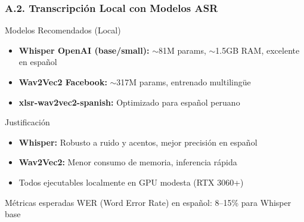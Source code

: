 \documentclass[aspectratio=169,10pt]{beamer}
\begin{document}
\begin{frame}
  \frametitle{A.2. Transcripción Local con Modelos ASR}
  
  \begin{block}{Modelos Recomendados (Local) \cite{radford2022whisper}}
    \begin{itemize}
      \item \textbf{Whisper OpenAI (base/small):} $\sim$81M params, $\sim$1.5GB RAM, excelente en español
      \item \textbf{Wav2Vec2 Facebook:} $\sim$317M params, entrenado multilingüe
      \item \textbf{xlsr-wav2vec2-spanish:} Optimizado para español peruano
    \end{itemize}
  \end{block}

  \begin{block}{Justificación}
    \begin{itemize}
      \item \textbf{Whisper:} Robusto a ruido y acentos, mejor precisión en español
      \item \textbf{Wav2Vec2:} Menor consumo de memoria, inferencia rápida
      \item Todos ejecutables localmente en GPU modesta (RTX 3060+)
    \end{itemize}
  \end{block}

  \begin{block}{Métricas esperadas}
    WER (Word Error Rate) en español: 8--15\% para Whisper base
  \end{block}
\end{frame}
\end{document}
